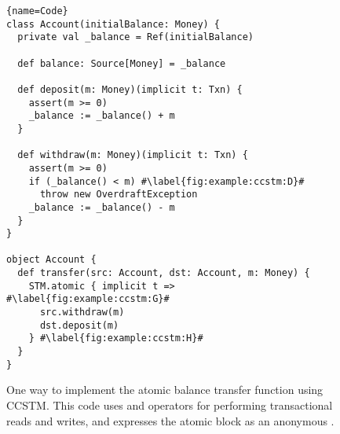 \begin{figure}
\begin{lstlisting}{name=Code}
class Account(initialBalance: Money) {
  private val _balance = Ref(initialBalance)

  def balance: Source[Money] = _balance

  def deposit(m: Money)(implicit t: Txn) {
    assert(m >= 0)
    _balance := _balance() + m
  }

  def withdraw(m: Money)(implicit t: Txn) {
    assert(m >= 0)
    if (_balance() < m) #\label{fig:example:ccstm:D}#
      throw new OverdraftException
    _balance := _balance() - m
  }
}

object Account {
  def transfer(src: Account, dst: Account, m: Money) {
    STM.atomic { implicit t => #\label{fig:example:ccstm:G}#
      src.withdraw(m)
      dst.deposit(m)
    } #\label{fig:example:ccstm:H}#
  }
}
\end{lstlisting}

\caption{One way to implement the atomic balance transfer function
using CCSTM.  This code uses  and \code{:=} operators
for performing transactional reads and writes, and expresses the atomic
block as an anonymous .}

\label{fig:example:ccstm}
\end{figure}
